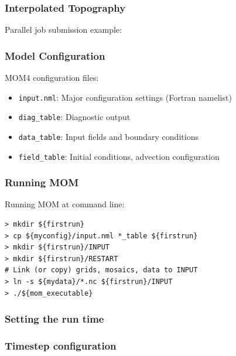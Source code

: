 \documentclass[red]{beamer}
\begin{document}
\begin{frame}
    \frametitle{Interpolated Topography}
    
    Parallel job submission example:
    
\end{frame}

\begin{frame}
    \frametitle{Model Configuration}
    
    MOM4 configuration files:
    \begin{itemize}
        \item \lstinline|input.nml|: Major configuration settings (Fortran
            namelist)
        \item \lstinline|diag_table|: Diagnostic output
        \item \lstinline|data_table|: Input fields and boundary conditions
        \item \lstinline|field_table|: Initial conditions, advection
            configuration
    \end{itemize}
\end{frame}

\begin{frame}[fragile]
    \frametitle{Running MOM}
    
    Running MOM at command line:
    \begin{lstlisting}
> mkdir ${firstrun}
> cp ${myconfig}/input.nml *_table ${firstrun}
> mkdir ${firstrun}/INPUT
> mkdir ${firstrun}/RESTART
# Link (or copy) grids, mosaics, data to INPUT
> ln -s ${mydata}/*.nc ${firstrun}/INPUT
> ./${mom_executable}
    \end{lstlisting}
\end{frame}

\begin{frame}[fragile]
    \frametitle{Setting the run time}
    
    
\end{frame}

\begin{frame}[fragile]
    \frametitle{Timestep configuration}
    
    
\end{frame}
\end{document}
